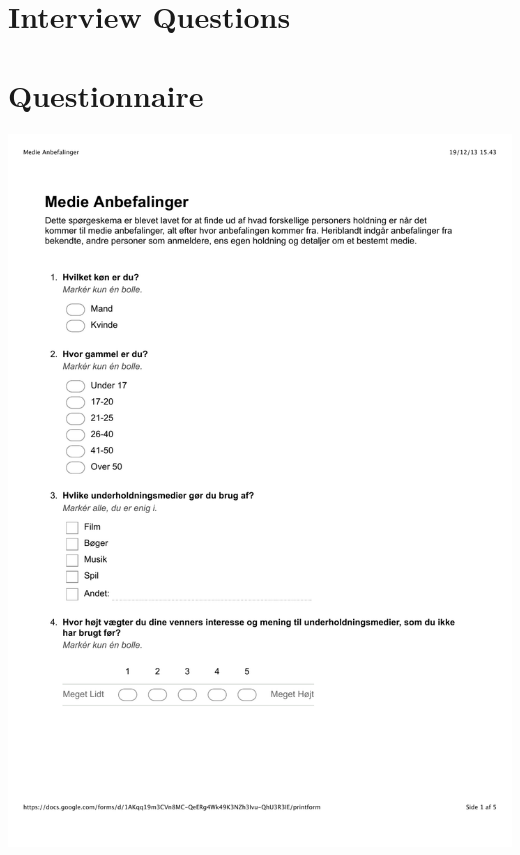 \section*{Interview Questions}
\let\cleardoublepage\clearpage

\section*{Questionnaire}
\includegraphics[page=1, scale=0.75]{Appendix/MedieAnbefalingerQ.pdf}
\newpage



